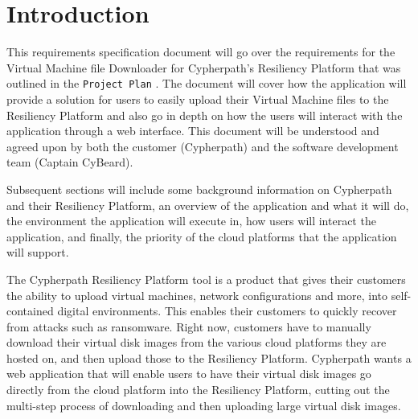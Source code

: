 \documentclass{article}
\begin{document}
    


    \tableofcontents
    \newpage
    \listoffigures


    \newpage
    \begin{versionhistory}
    \end{versionhistory}
    \newpage


    \section{Introduction}
    This requirements specification document will go over the requirements for the Virtual Machine file Downloader for Cypherpath's Resiliency Platform that was outlined in the
    \texttt{Project Plan} \cite{projectplan}.
    The document will cover how the application will provide a solution for users to easily upload their Virtual Machine files to the Resiliency Platform and also
    go in depth on how the users will interact with the application through a web interface. This document will be understood and agreed
    upon by both the customer (Cypherpath) and the software development team (Captain CyBeard).

    Subsequent sections will include some background information on Cypherpath and their Resiliency Platform, an overview of the application and what it
    will do, the environment the application will execute in, how users will interact the application, and finally, the priority of the cloud platforms that the application will support.

	The Cypherpath Resiliency Platform tool is a product that gives their customers the ability to upload virtual machines, network configurations and more, into 
    self-contained digital environments. This enables their customers to quickly recover from attacks such as ransomware. Right now, customers have to manually download their virtual disk images from
    the various cloud platforms they are hosted on, and then upload those to the Resiliency Platform. Cypherpath wants a web application that will enable users to have their virtual disk images go
    directly from the cloud platform into the Resiliency Platform, cutting out the multi-step process of downloading and then uploading large virtual disk images.
	
\end{document}
